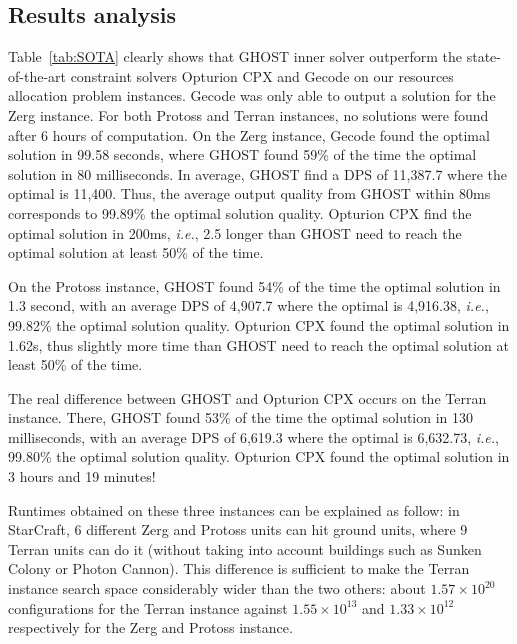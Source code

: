 \documentclass[journal]{IEEEtran}
\newcommand{\ghost}{\textsc{GHOST}\xspace}
\newcommand{\ie}{\textit{i.e.}}
\begin{document}
\subsection{Results analysis}

Table~\ref{tab:SOTA} clearly shows that \ghost inner solver outperform
the state-of-the-art constraint solvers Opturion CPX and Gecode on our
resources allocation problem instances. Gecode was only able to output
a  solution  for  the  Zerg  instance. For  both  Protoss  and  Terran
instances, no  solutions were found  after 6 hours of  computation. On
the Zerg instance, Gecode found the optimal solution in 99.58 seconds,
where  \ghost found  59\%  of  the time  the  optimal  solution in  80
milliseconds.  In  average, \ghost  find a DPS  of 11,387.7  where the
optimal is 11,400. Thus, the average output quality from \ghost within
80ms corresponds to 99.89\% the optimal solution quality. Opturion CPX
find  the optimal  solution  in  200ms, \ie,  2.5  longer than  \ghost
need to reach the optimal solution at least 50\% of the time.

On the  Protoss instance, \ghost  found 54\%  of the time  the optimal
solution  in 1.3  second, with  an average  DPS of  4,907.7 where  the
optimal   is    4,916.38,   \ie,   99.82\%   the    optimal   solution
quality.  Opturion  CPX  found  the optimal  solution  in  1.62s,  thus
slightly more time  than \ghost need to reach the  optimal solution at
least 50\% of the time.

The  real difference  between \ghost  and Opturion  CPX occurs  on the
Terran  instance. There,  \ghost found  53\% of  the time  the optimal
solution in 130 milliseconds, with an average DPS of 6,619.3 where the
optimal  is  6,632.73,  \ie,  99.80\% the  optimal  solution  quality.
Opturion CPX found the optimal solution in 3 hours and 19 minutes!

Runtimes obtained on these three instances can be explained as follow:
in StarCraft, 6 different Zerg and Protoss units can hit ground units,
where 9 Terran units can do  it (without taking into account buildings
such  as  Sunken  Colony  or   Photon  Cannon).   This  difference  is
sufficient to make the Terran instance search space considerably wider
than the  two others: about  $1.57 \times 10^{20}$  configurations for
the Terran  instance against  $1.55 \times  10^{13}$ and  $1.33 \times
10^{12}$ respectively for the Zerg and Protoss instance.
\end{document}
